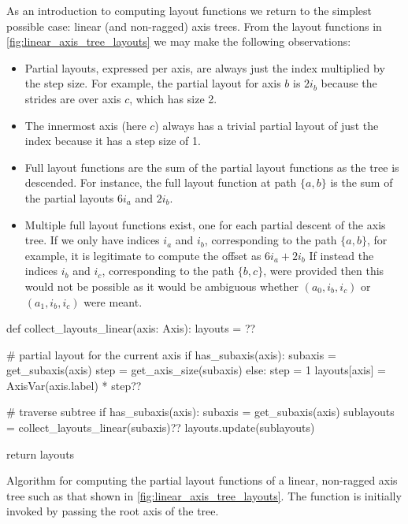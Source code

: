 \documentclass[thesis]{subfiles}
\begin{document}
As an introduction to computing layout functions we return to the simplest possible case: linear (and non-ragged) axis trees.
From the layout functions in \cref{fig:linear_axis_tree_layouts} we may make the following observations:
\begin{itemize}
  \item
    Partial layouts, expressed per axis, are always just the index multiplied by the step size.
    For example, the partial layout for axis $b$ is $2 i_b$ because the strides are over axis $c$, which has size 2.
  \item
    The innermost axis (here $c$) always has a trivial partial layout of just the index because it has a step size of 1.
  \item
    Full layout functions are the sum of the partial layout functions as the tree is descended.
    For instance, the full layout function at path $\{a,b\}$ is the sum of the partial layouts $6 i_a$ and $2 i_b$.

  \item
    Multiple full layout functions exist, one for each partial descent of the axis tree.
    If we only have indices $i_a$ and $i_b$, corresponding to the path $\{a,b\}$, for example, it is legitimate to compute the offset as $6i_a+2i_b$
    If instead the indices $i_b$ and $i_c$, corresponding to the path $\{b,c\}$, were provided then this would not be possible as it would be ambiguous whether $(a_0, i_b, i_c)$ or $(a_1, i_b, i_c)$ were meant.
\end{itemize}

\begin{algorithm}
  \begin{center}
    \begin{minipage}{.9\textwidth}
      \begin{pyalg2}
        def collect_layouts_linear(axis: Axis):
          layouts = {}?\label{code:layouts_dict_init}?

          # partial layout for the current axis
          if has_subaxis(axis):
            subaxis = get_subaxis(axis)
            step = get_axis_size(subaxis)
          else:
            step = 1
          layouts[axis] = AxisVar(axis.label) * step?\label{code:linear_layout}?

          # traverse subtree
          if has_subaxis(axis): 
            subaxis = get_subaxis(axis)
            sublayouts = collect_layouts_linear(subaxis)?\label{code:linear_sublayouts}?
            layouts.update(sublayouts)

          return layouts
      \end{pyalg2}
    \end{minipage}
  \end{center}

  \caption{
    Algorithm for computing the partial layout functions of a linear, non-ragged axis tree such as that shown in \cref{fig:linear_axis_tree_layouts}.
    The function is initially invoked by passing the root axis of the tree.
  }
  \label{alg:collect_layouts_linear}
\end{algorithm}
\end{document}
